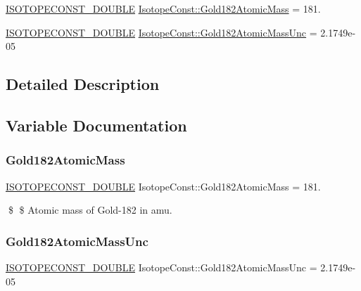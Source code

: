 \begin{DoxyCompactItemize}
\item 
\mbox{\hyperlink{group___isotope_const-_macros_ga8f45a7272ce02c0b4c65c44636ed719a}{I\+S\+O\+T\+O\+P\+E\+C\+O\+N\+S\+T\+\_\+\+D\+O\+U\+B\+LE}} \mbox{\hyperlink{group___isotope_const-_gold-_au182_ga7401508ee322e436a6a71871197bead8}{Isotope\+Const\+::\+Gold182\+Atomic\+Mass}} = 181.
\item 
\mbox{\hyperlink{group___isotope_const-_macros_ga8f45a7272ce02c0b4c65c44636ed719a}{I\+S\+O\+T\+O\+P\+E\+C\+O\+N\+S\+T\+\_\+\+D\+O\+U\+B\+LE}} \mbox{\hyperlink{group___isotope_const-_gold-_au182_ga07ddeea4de453ba6e44148fc5b3fdaa5}{Isotope\+Const\+::\+Gold182\+Atomic\+Mass\+Unc}} = 2.\+1749e-\/05
\end{DoxyCompactItemize}


\subsection{Detailed Description}


\subsection{Variable Documentation}
\mbox{\label{group___isotope_const-_gold-_au182_ga7401508ee322e436a6a71871197bead8}} 
\subsubsection{\texorpdfstring{Gold182\+Atomic\+Mass}{Gold182AtomicMass}}
{\footnotesize\ttfamily \mbox{\hyperlink{group___isotope_const-_macros_ga8f45a7272ce02c0b4c65c44636ed719a}{I\+S\+O\+T\+O\+P\+E\+C\+O\+N\+S\+T\+\_\+\+D\+O\+U\+B\+LE}} Isotope\+Const\+::\+Gold182\+Atomic\+Mass = 181.}

\$ \$ Atomic mass of Gold-\/182 in amu. \mbox{\label{group___isotope_const-_gold-_au182_ga07ddeea4de453ba6e44148fc5b3fdaa5}} 
\subsubsection{\texorpdfstring{Gold182\+Atomic\+Mass\+Unc}{Gold182AtomicMassUnc}}
{\footnotesize\ttfamily \mbox{\hyperlink{group___isotope_const-_macros_ga8f45a7272ce02c0b4c65c44636ed719a}{I\+S\+O\+T\+O\+P\+E\+C\+O\+N\+S\+T\+\_\+\+D\+O\+U\+B\+LE}} Isotope\+Const\+::\+Gold182\+Atomic\+Mass\+Unc = 2.\+1749e-\/05}


